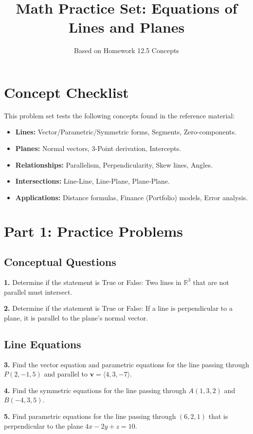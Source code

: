 \documentclass[12pt]{article}
\title{Math Practice Set: Equations of Lines and Planes}
\author{Based on Homework 12.5 Concepts}
\date{}
\begin{document}
\maketitle

\section*{Concept Checklist}
This problem set tests the following concepts found in the reference material:
\begin{itemize}
    \item \textbf{Lines:} Vector/Parametric/Symmetric forms, Segments, Zero-components.
    \item \textbf{Planes:} Normal vectors, 3-Point derivation, Intercepts.
    \item \textbf{Relationships:} Parallelism, Perpendicularity, Skew lines, Angles.
    \item \textbf{Intersections:} Line-Line, Line-Plane, Plane-Plane.
    \item \textbf{Applications:} Distance formulas, Finance (Portfolio) models, Error analysis.
\end{itemize}

\section*{Part 1: Practice Problems}

\subsection*{Conceptual Questions}
\textbf{1.} Determine if the statement is True or False: Two lines in $\mathbb{R}^3$ that are not parallel must intersect.

\textbf{2.} Determine if the statement is True or False: If a line is perpendicular to a plane, it is parallel to the plane's normal vector.

\subsection*{Line Equations}
\textbf{3.} Find the vector equation and parametric equations for the line passing through $P(2, -1, 5)$ and parallel to $\mathbf{v} = \langle 4, 3, -7 \rangle$.

\textbf{4.} Find the symmetric equations for the line passing through $A(1, 3, 2)$ and $B(-4, 3, 5)$.

\textbf{5.} Find parametric equations for the line passing through $(6, 2, 1)$ that is perpendicular to the plane $4x - 2y + z = 10$.
\end{document}
